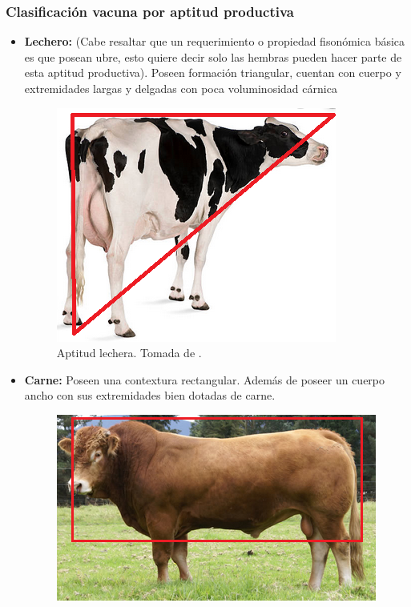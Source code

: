 
\subsubsection{Clasificación vacuna por aptitud productiva}
\begin{itemize}
\item \textbf{Lechero:} (Cabe resaltar que un requerimiento o propiedad fisonómica básica es que posean ubre, esto quiere decir solo las hembras pueden hacer parte de esta aptitud productiva). Poseen formación triangular, cuentan con cuerpo y extremidades largas y delgadas con poca voluminosidad cárnica
\begin{figure}[H]
 \begin{center}
 \includegraphics[scale=0.9]{img/dibujito2.png}
 \end{center}
 \caption{Aptitud lechera. Tomada de \cite{googlepics}. }
\end{figure}
\item \textbf{Carne:} Poseen una contextura rectangular. Además de poseer un cuerpo ancho con sus extremidades bien dotadas de carne.
\begin{figure}[H]
 \begin{center}
 \includegraphics[scale=0.9]{img/dibujito3.png}

\end{center}
\end{figure}
\end{itemize}

